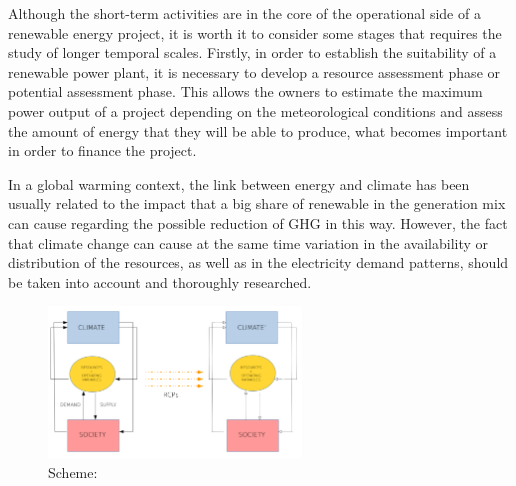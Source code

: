 Although the short-term activities are in the core of the operational side of a renewable energy project, it is worth it to consider some stages that requires the study of longer temporal scales. Firstly, in order to establish the suitability of a renewable power plant, it is necessary to develop a resource assessment phase or potential assessment phase. This allows the owners to estimate the maximum power output of a project depending on the meteorological conditions and assess the amount of energy that they will be able to produce, what becomes important in order to finance the project.  



In a global warming context, the link between energy and climate has been usually related to the impact that a big share of renewable in the generation mix can cause regarding the possible reduction of GHG in this way. However, the fact that climate change can cause at the same time variation in the availability or distribution of the resources, as well as in the electricity demand patterns, should be taken into account and thoroughly researched. 

\begin{figure}[h!]
\centering\includegraphics[width=0.6\textwidth]{figs/esquema.pdf}
\caption{Scheme: }
\label{fig:feedback}
\end{figure}


